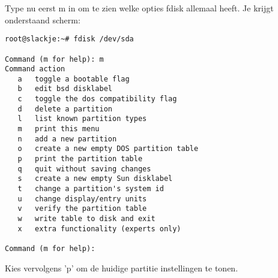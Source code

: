 Type nu eerst m in om te zien welke opties fdisk allemaal heeft. Je krijgt onderstaand scherm:
\begin{lstlisting}
root@slackje:~# fdisk /dev/sda

Command (m for help): m
Command action
   a   toggle a bootable flag
   b   edit bsd disklabel
   c   toggle the dos compatibility flag
   d   delete a partition
   l   list known partition types
   m   print this menu
   n   add a new partition
   o   create a new empty DOS partition table
   p   print the partition table
   q   quit without saving changes
   s   create a new empty Sun disklabel
   t   change a partition's system id
   u   change display/entry units
   v   verify the partition table
   w   write table to disk and exit
   x   extra functionality (experts only)

Command (m for help): 
\end{lstlisting}
Kies vervolgens 'p' om de huidige partitie instellingen te tonen.

